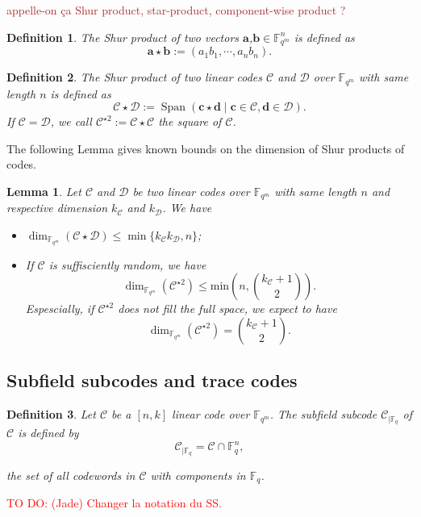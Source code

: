 \documentclass[a4paper]{article}
\newtheorem{def1}{Definition}
\newtheorem{lem1}{Lemma}
\newcommand{\calC}{\mathcal{C}}
\newcommand{\calD}{\mathcal{D}}
\newcommand{\fqm}{\mathbb{F}_{q^m}}
\newcommand{\Span}[1]{\operatorname{Span}\left(#1\right)}
\newcommand\TODO[1]{\textcolor{red}{TO DO: #1}}
\newcommand\mathieu[1]{\textcolor{brown}{#1}}
\begin{document}
\mathieu{appelle-on ça Shur product, star-product, component-wise product ?}
{\color{brown}
\begin{def1}
The Shur product of two vectors $\mathbf{a}$,$\mathbf{b} \in \fqm^n$ is defined as 
\[ \mathbf{a} \star \mathbf{b} := (a_1b_1,\cdots,a_nb_n). \]
\end{def1}

\begin{def1} The Shur product of two linear codes $\calC$ and $\calD$ over $\fqm$ with same length $n$ is defined as
\[ \calC \star \calD := \Span{\mathbf{c} \star \mathbf{d} \mid \mathbf{c} \in \calC, \mathbf{d} \in \calD}.  \]
If $\calC = \calD$, we call $\calC^{\star 2} := \calC \star \calC$ the square of $\calC$.
\end{def1}

The following Lemma gives known bounds on the dimension of Shur products of codes.

\begin{lem1} \label{lem:known_bounds}
Let $\calC$ and $\calD$ be two linear codes over $\fqm$ with same length $n$ and respective dimension $k_{\calC}$ and $k_{\calD}$. We have
\begin{itemize}
	\item[$(2)$] $\dim_{\fqm}(\calC \star \calD) \leq \min\{k_{\calC}k_{\calD},n\}$;
	\item[$(3)$] If $\calC$ is suffisciently random, we have
\[ \dim_{\mathbb{F}_{q^m}}(\calC^{\star2}) \leq \mathrm{min}\left(n,\binom{k_{\calC}+1}{2}\right) . \]
Espescially, if $\calC^{\star2}$ does not fill the full space, we expect to have 
	\[ \dim_{\mathbb{F}_{q^m}}(\calC^{\star2}) = \binom{k_{\calC}+1}{2}.\]
	\end{itemize}
\end{lem1}
}


\subsection{Subfield subcodes and trace codes}

\begin{def1}
	Let $\calC$ be a $[n,k]$ linear code over $\mathbb{F}_{q^m}$. The subfield subcode $\calC_{\mid\mathbb{F}_{q}}$ of $\calC$ is defined by
	\[
	\calC_{\mid\mathbb{F}_q}=\calC \cap \mathbb{F}_q^n,
	\]
	
	the set of all codewords in $\calC$ with components in $\mathbb{F}_q$.
\end{def1}

\TODO{(Jade) Changer la notation du SS.}
\end{document}

